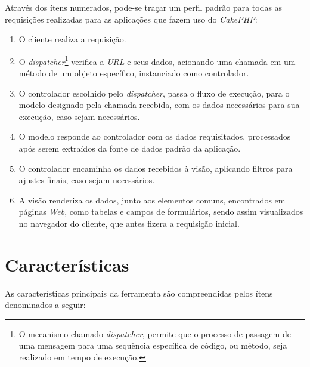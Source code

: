 Através dos ítens numerados, pode-se traçar um perfil padrão para todas as requisições realizadas para as aplicações que fazem uso do \textit{CakePHP}:
\begin{enumerate}
    \item O cliente realiza a requisição.

    \item O \textit{dispatcher}\footnote{O mecanismo chamado \textit{dispatcher}, permite que o processo de passagem de uma mensagem para uma sequência específica de código, ou método, seja realizado em tempo de execução.} verifica a \textit{URL} e seus dados, acionando uma chamada em um método de um objeto específico, instanciado como controlador.

    \item O controlador escolhido pelo \textit{dispatcher}, passa o fluxo de execução, para o modelo designado pela chamada recebida, com os dados necessários para sua execução, caso sejam necessários.

    \item O modelo responde ao controlador com os dados requisitados, processados após serem extraídos da fonte de dados padrão da aplicação.

    \item O controlador encaminha os dados recebidos à visão, aplicando filtros para ajustes finais, caso sejam necessários.

    \item A visão renderiza os dados, junto aos elementos comuns, encontrados em páginas \textit{Web}, como tabelas e campos de formulários, sendo assim visualizados no navegador do cliente, que antes fizera a requisição inicial.
\end{enumerate}


\section{Características}

As características principais da ferramenta são compreendidas pelos ítens denominados a seguir:


